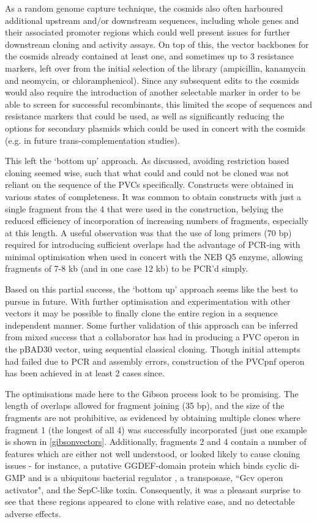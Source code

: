 As a random genome capture technique, the cosmids also often harboured additional upstream and/or downstream sequences, including whole genes and their associated promoter regions which could well present issues for further downstream cloning and activity assays. On top of this, the vector backbones for the cosmids already contained at least one, and sometimes up to 3 resistance markers, left over from the initial selection of the library (ampicillin, kanamycin and neomycin, or chloramphenicol). Since any subsequent edits to the cosmids would also require the introduction of another selectable marker in order to be able to screen for successful recombinants, this limited the scope of sequences and resistance markers that could be used, as well as significantly reducing the options for secondary plasmids which could be used in concert with the cosmids (e.g. in future trans-complementation studies).

This left the `bottom up' approach. As discussed, avoiding restriction based cloning seemed wise, such that what could and could not be cloned was not reliant on the sequence of the PVCs specifically. Constructs were obtained in various states of completeness. It was common to obtain constructs with just a single fragment from the 4 that were used in the construction, belying the reduced efficiency of incorporation of increasing numbers of fragments, especially at this length. A useful observation was that the use of long primers (70 bp) required for introducing sufficient overlaps had the advantage of PCR-ing with minimal optimisation when used in concert with the NEB Q5 enzyme, allowing fragments of 7-8 kb (and in one case 12 kb) to be PCR'd simply.

Based on this partial success, the `bottom up' approach seems like the best to pursue in future. With further optimisation and experimentation with other vectors it may be possible to finally clone the entire region in a sequence independent manner. Some further validation of this approach can be inferred from mixed success that a collaborator has had in producing a PVC operon in the pBAD30 vector, using sequential classical cloning. Though initial attempts had failed due to PCR and assembly errors, construction of the PVCpnf operon has been achieved in at least 2 cases since.

The optimisations made here to the Gibson process look to be promising. The length of overlaps allowed for fragment joining (35 bp), and the size of the fragments are not prohibitive, as evidenced by obtaining multiple clones where fragment 1 (the longest of all 4) was successfully incorporated (just one example is shown in \vref{gibsonvectors}. Additionally, fragments 2 and 4 contain a number of features which are either not well understood, or looked likely to cause cloning issues - for instance, a putative GGDEF-domain protein which binds cyclic di-GMP and is a ubiquitous bacterial regulator \citep{Paul2004a}, a transposase, ``Gcv operon activator", and the SepC-like toxin. Consequently, it was a pleasant surprise to see that these regions appeared to clone with relative ease, and no detectable adverse effects.

